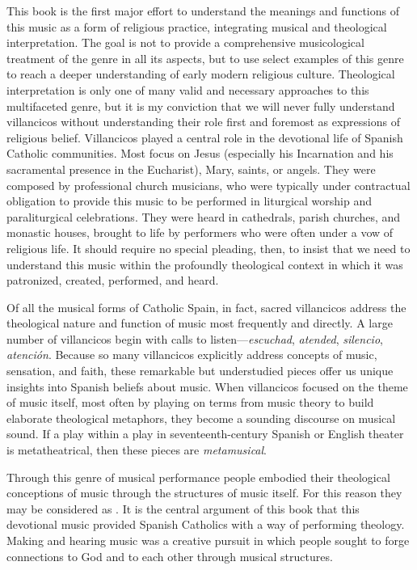 This book is the first major effort to understand the meanings and functions of
this music as a form of religious practice, integrating musical and theological
interpretation.
The goal is not to provide a comprehensive musicological treatment of the genre
in all its aspects, but to use select examples of this genre to reach a deeper
understanding of early modern religious culture.
Theological interpretation is only one of many valid and necessary approaches
to this multifaceted genre, but it is my conviction that we will never fully
understand villancicos without understanding their role first and foremost as
expressions of religious belief. 
Villancicos played a central role in the devotional life of Spanish Catholic
communities.
Most focus on Jesus (especially his Incarnation and his sacramental presence in
the Eucharist), Mary, saints, or angels.
They were composed by professional church musicians, who were typically under
contractual obligation to provide this music to be performed in liturgical
worship and paraliturgical celebrations.
They were heard in cathedrals, parish churches, and monastic houses, brought to
life by performers who were often under a vow of religious life.
It should require no special pleading, then, to insist that we need to
understand this music within the profoundly theological context in which it was
patronized, created, performed, and heard.

Of all the musical forms of Catholic Spain, in fact, sacred villancicos address
the theological nature and function of music most frequently and directly.
A large number of villancicos begin with calls to listen---\emph{escuchad},
\emph{atended}, \emph{silencio}, \emph{atención}. 
Because so many villancicos explicitly address concepts of music, sensation, and
faith, these remarkable but understudied pieces offer us unique insights into
Spanish beliefs about music.
When villancicos focused on the theme of music itself, most often by playing on
terms from music theory to build elaborate theological metaphors, they become a
sounding discourse on musical sound.
If a play within a play in seventeenth-century Spanish or English theater is
metatheatrical, then these pieces are \emph{metamusical}.

Through this genre of musical performance people embodied their theological
conceptions of music through the structures of music itself.
For this reason they may be considered as .
It is the central argument of this book that this devotional music provided
Spanish Catholics with a way of performing theology. 
Making and hearing music was a creative pursuit in which people sought to forge
connections to God and to each other through musical structures.


